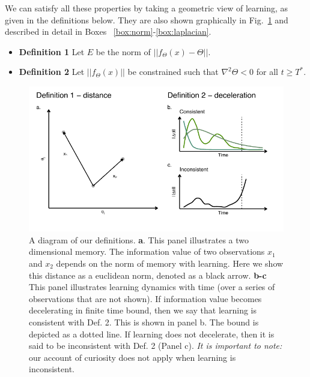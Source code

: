 We can satisfy all these properties by taking a geometric view of learning, as given in the definitions below. They are also shown graphically in Fig.~\ref{fig:cartoon} and described in detail in Boxes ~\ref{box:norm}-\ref{box:laplacian}.

\begin{itemize}
	\item[] \textbf{Definition 1} Let $E$ be the norm of $|| f_{\Theta}(x) - \Theta ||$.	
	\item[] \textbf{Definition 2} Let $|| f_{\Theta}(x)||$ be constrained such that $\nabla^2 \Theta < 0$ for all $ t \ge T^*$. 	
\end{itemize}

\begin{figure}
	\begin{fullwidth}
	\includegraphics[width=0.7\linewidth]{img/cartoon.pdf} 
	\caption{A diagram of our definitions. 
	\textbf{a}. This panel illustrates a two dimensional memory. The information value of two observations $x_1$ and $x_2$ depends on the norm of memory with learning. Here we show this distance as a euclidean norm, denoted as a black arrow.
	\textbf{b-c} This panel illustrates learning dynamics with time (over a series of observations that are not shown). If information value becomes decelerating in finite time bound, then we say that learning is consistent with Def. 2. This is shown in panel b. The bound is depicted as a dotted line. If learning does not decelerate, then it is said to be inconsistent with Def. 2 (Panel c). \textit{It is important to note:} our account of curiosity does not apply when learning is inconsistent.
  	}
	\label{fig:cartoon} 
	\end{fullwidth}
\end{figure}

